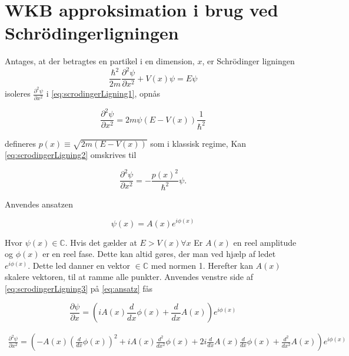 \section{WKB approksimation i brug ved Schrödingerligningen}
Antages, at der betragtes en partikel i en dimension, $x$,  er Schrödinger ligningen
%
\begin{equation}
    \frac{\hbar^2}{2m}\frac{\partial^2 \psi}{\partial x^2} + V(x) \psi = E \psi
    \label{eq:scrodingerLigning1}
\end{equation}
%
isoleres $\frac{\partial^2 \psi}{\partial x^2}$ i \cref{eq:scrodingerLigning1}, opnås

\begin{equation}
    \frac{\partial^2 \psi}{\partial x^2} = 2m\psi (E  - V(x)) \frac{1}{\hbar^2}
    \label{eq:scrodingerLigning2}
\end{equation}

defineres $p(x) \equiv \sqrt{2m(E-V(x))}$ som i klassisk regime, Kan \cref{eq:scrodingerLigning2} omskrives til

\begin{equation}
    \frac{\partial^2 \psi}{\partial x^2} = - \frac{p(x)^2}{\hbar^2} \psi.
    \label{eq:scrodingerLigning3}
\end{equation}

Anvendes ansatzen

\begin{equation}
    \psi(x) = A(x) e^{i \phi(x)}
    \label{eq:ansatz}
\end{equation}

Hvor $\psi (x) \in \mathbb{C}$. Hvis det gælder at $ E > V(x) \forall x$ Er $A(x)$ en reel amplitude og $\phi(x)$ er en reel fase. Dette kan altid gøres, der man ved hjælp af ledet  $e^{i \phi(x)} $. Dette led danner en vektor $ \in \mathbb{C}$ med normen 1. Herefter kan $A(x)$  skalere vektoren, til at ramme alle punkter. Anvendes venstre side af \cref{eq:scrodingerLigning3} på \cref{eq:ansatz} fås

\begin{equation}
    \frac{\partial \psi}{\partial x} = \left(i A{\left (x \right )} \frac{d}{d x} \phi{\left (x \right )} + \frac{d}{d x} A{\left (x \right )}\right) e^{i \phi{\left (x \right )}}
    \label{eq:diff1gange}
\end{equation}

\begin{align}
    \frac{\partial^2 \psi}{\partial x^2} = \left(- A{\left (x \right )} \left(\frac{d}{d x} \phi{\left (x \right )}\right)^{2} + i A{\left (x \right )} \frac{d^{2}}{d x^{2}}  \phi{\left (x \right )} + 2 i \frac{d}{d x} A{\left (x \right )} \frac{d}{d x} \phi{\left (x \right )} + \frac{d^{2}}{d x^{2}}  A{\left (x \right )}\right) e^{i \phi{\left (x \right )}}
    \label{eq:diff2gange}
\end{align}

